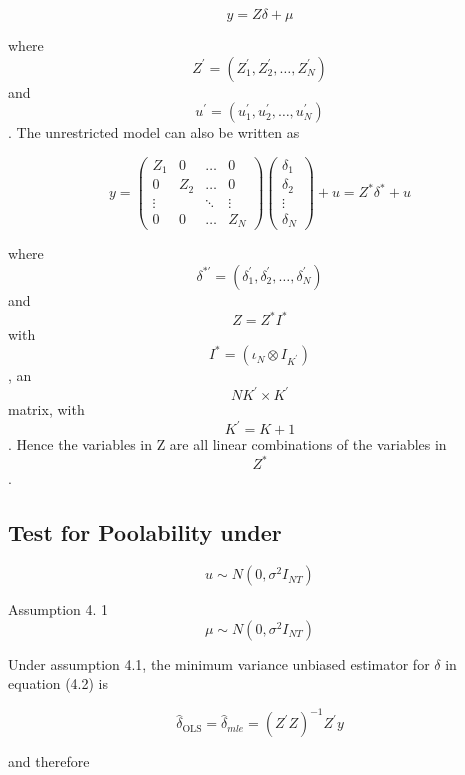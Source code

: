 \documentclass[
]{book}
\begin{document}
\begin{equation}
y= Z \delta + \mu
\end{equation}

where \[ Z^{\prime}=\left(Z_{1}^{\prime} , Z_{2}^{\prime}, \ldots, Z_{N}^{\prime}\right) \] and \[ u^{\prime}=\left(u_{1}^{\prime}, u_{2}^{\prime}, \ldots, u_{N}^{\prime}\right) \] . The unrestricted model can also be written as

\begin{equation}
y=\left(\begin{array}{cccc}
Z_{1} & 0 & \ldots & 0 \\
0 & Z_{2} & \ldots & 0 \\
\vdots & & \ddots & \vdots \\
0 & 0 & \ldots & Z_{N}
\end{array}\right)\left(\begin{array}{c}
\delta_{1} \\
\delta_{2} \\
\vdots \\
\delta_{N}
\end{array}\right)+u=Z^{*} \delta^{*}+u
\end{equation}

where \[\delta^{* \prime}=\left(\delta_{1}^{\prime}, \delta_{2}^{\prime}, \ldots, \delta_{N}^{\prime}\right)\] and \[ Z=Z^{*} I^{*} \] with \[ I^{*}=\left(\iota_{N} \otimes I_{K^{\prime}}\right)\], an \[ N K^{\prime} \times K^{\prime}\] matrix, with
\[K^{\prime}=K+1 \] . Hence the variables in Z are all linear combinations of the variables in \[ Z^{*}\] .

\hypertarget{test-for-poolability-under}{%
\subsection{Test for Poolability under}\label{test-for-poolability-under}}

\[ u \sim N\left(0, \sigma^{2} I_{N T}\right)\]

Assumption 4. 1 \[\mu   \sim N\left(0, \sigma^{2} I_{N T}\right)\]

Under assumption 4.1, the minimum variance unbiased estimator for \(\delta\) in equation (4.2) is

\begin{equation}
\widehat{\delta}_{\mathrm{OLS}}=\widehat{\delta}_{m l e}=\left(Z^{\prime} Z\right)^{-1} Z^{\prime} y
\end{equation}

and therefore
\end{document}
